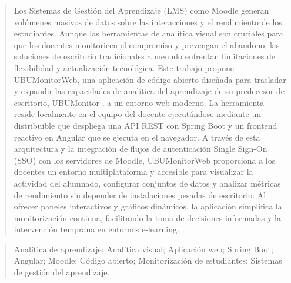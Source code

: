 \documentclass[a4paper,12pt,twoside]{memoir}
\begin{document}
\renewcommand*\abstractname{Resumen}
\begin{abstract}
Los Sistemas de Gestión del Aprendizaje (LMS) como Moodle generan volúmenes masivos de datos sobre las interacciones y el rendimiento de los estudiantes. Aunque las herramientas de analítica visual son cruciales para que los docentes monitoricen el compromiso y prevengan el abandono, las soluciones de escritorio tradicionales a menudo enfrentan limitaciones de flexibilidad y actualización tecnológica. Este trabajo propone UBUMonitorWeb, una aplicación de código abierto diseñada para trasladar y expandir las capacidades de analítica del aprendizaje de su predecesor de escritorio, UBUMonitor \cite{ubumonitor}, a un entorno web moderno. La herramienta reside localmente en el equipo del docente ejecutándose mediante un distribuible que despliega una API REST con Spring Boot y un frontend reactivo en Angular que se ejecuta en el navegador. A través de esta arquitectura y la integración de flujos de autenticación Single Sign-On (SSO) con los servidores de Moodle, UBUMonitorWeb proporciona a los docentes un entorno multiplataforma y accesible para visualizar la actividad del alumnado, configurar conjuntos de datos y analizar métricas de rendimiento sin depender de instalaciones pesadas de escritorio. Al ofrecer paneles interactivos y gráficos dinámicos, la aplicación simplifica la monitorización continua, facilitando la toma de decisiones informadas y la intervención temprana en entornos e-learning.
\end{abstract}

\renewcommand*\abstractname{Descriptores}
\begin{abstract}
Analítica de aprendizaje; Analítica visual; Aplicación web; Spring Boot; Angular; Moodle; Código abierto; Monitorización de estudiantes; Sistemas de gestión del aprendizaje.
\end{abstract}

\clearpage
\end{document}
